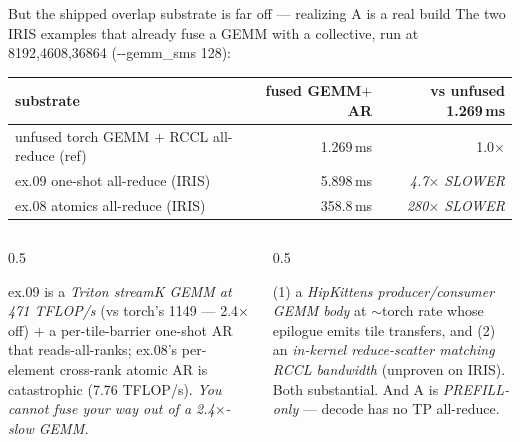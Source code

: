 \documentclass[pdf,aspectratio=169]{beamer}
\newcommand{\empy}[1]{{\color{darkorange}\emph{#1}}}
\newcommand{\empr}[1]{{\color{cardinalred}\emph{#1}}}
\newcommand{\examplebox}[2]{%
\begin{tcolorbox}[colframe=darkcardinal,colback=boxgray,title={#1}]
#2
\end{tcolorbox}}
\newcommand{\mc}[1]{{\ttfamily\small #1}}
\begin{document}
\begin{frame}{But the shipped overlap substrate is far off --- realizing A is a real build}
\footnotesize
The two IRIS examples that already fuse a GEMM with a collective, run at \mc{8192,4608,36864} (\mc{-{}-gemm\_sms 128}):
\begin{center}
\scriptsize
\begin{tabular}{l r r}
\toprule
substrate & fused GEMM$+$AR & vs unfused 1.269\,ms \\
\midrule
unfused torch GEMM $+$ RCCL all-reduce (ref) & 1.269\,ms & 1.0$\times$ \\
ex.09 one-shot all-reduce (IRIS) & 5.898\,ms & \empr{4.7$\times$ SLOWER} \\
ex.08 atomics all-reduce (IRIS) & 358.8\,ms & \empr{280$\times$ SLOWER} \\
\bottomrule
\end{tabular}
\end{center}
\begin{columns}
\begin{column}{0.5\textwidth}
\examplebox{Why they lose}{\footnotesize
ex.09 is a \empr{Triton streamK GEMM at 471 TFLOP/s} (vs torch's 1149 --- 2.4$\times$ off) $+$ a per-tile-barrier one-shot AR that reads-all-ranks; ex.08's per-element cross-rank atomic AR is catastrophic (7.76 TFLOP/s). \empy{You cannot fuse your way out of a 2.4$\times$-slow GEMM.}}
\end{column}
\begin{column}{0.5\textwidth}
\examplebox{What A actually needs}{\footnotesize
(1) a \empy{HipKittens producer/consumer GEMM body} at $\sim$torch rate whose epilogue emits tile transfers, and (2) an \empy{in-kernel reduce-scatter matching RCCL bandwidth} (unproven on IRIS). Both substantial. And A is \empr{PREFILL-only} --- decode has no TP all-reduce.}
\end{column}
\end{columns}
\end{frame}
\end{document}

